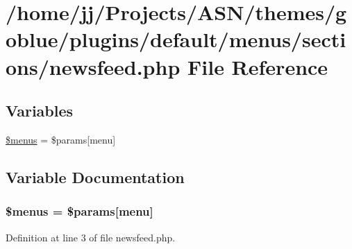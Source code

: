 \hypertarget{menus_2sections_2newsfeed_8php}{}\section{/home/jj/\+Projects/\+A\+S\+N/themes/goblue/plugins/default/menus/sections/newsfeed.php File Reference}
\label{menus_2sections_2newsfeed_8php}
\subsection*{Variables}
\begin{DoxyCompactItemize}
\item 
\hyperlink{menus_2sections_2newsfeed_8php_a681cf86fb2440a8c89c88603a08670ba}{\$menus} = \$params\mbox{[}\textquotesingle{}menu\textquotesingle{}\mbox{]}
\end{DoxyCompactItemize}


\subsection{Variable Documentation}
\subsubsection[{\texorpdfstring{\$menus}{$menus}}]{\setlength{\rightskip}{0pt plus 5cm}\$menus = \$params\mbox{[}\textquotesingle{}menu\textquotesingle{}\mbox{]}}\hypertarget{menus_2sections_2newsfeed_8php_a681cf86fb2440a8c89c88603a08670ba}{}\label{menus_2sections_2newsfeed_8php_a681cf86fb2440a8c89c88603a08670ba}


Definition at line 3 of file newsfeed.\+php.


